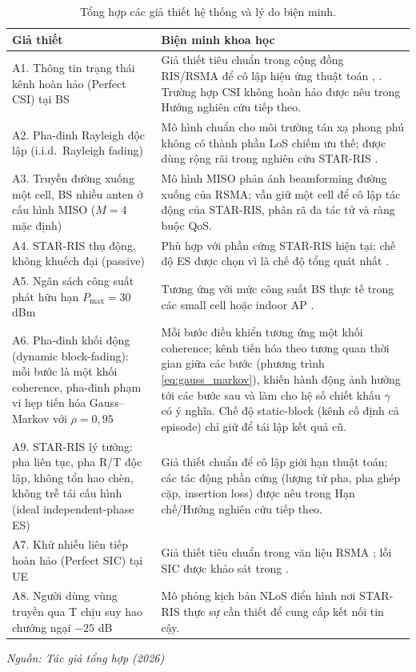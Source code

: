 \begin{table}[t]
\centering
\small
\caption{Tổng hợp các giả thiết hệ thống và lý do biện minh.}
\label{tab:assumptions}
\begin{tabular}{p{5.5cm} p{9cm}}
\toprule
\textbf{Giả thiết} & \textbf{Biện minh khoa học} \\
\midrule
A1. Thông tin trạng thái kênh hoàn hảo (Perfect CSI) tại BS &
Giả thiết tiêu chuẩn trong cộng đồng RIS/RSMA để cô lập hiệu ứng thuật toán \cite{liu2021starris}, \cite{mao2022rsma}. Trường hợp CSI không hoàn hảo được nêu trong Hướng nghiên cứu tiếp theo. \\
\addlinespace
A2. Pha-đinh Rayleigh độc lập (i.i.d.\ Rayleigh fading) &
Mô hình chuẩn cho môi trường tán xạ phong phú không có thành phần LoS chiếm ưu thế; được dùng rộng rãi trong nghiên cứu STAR-RIS \cite{mu2022simultaneously}. \\
\addlinespace
A3. Truyền đường xuống một cell, BS nhiều anten ở cấu hình MISO ($M=4$ mặc định) &
Mô hình MISO phản ánh beamforming đường xuống của RSMA; vẫn giữ một cell để cô lập tác động của STAR-RIS, phân rã đa tác tử và ràng buộc QoS. \\
\addlinespace
A4. STAR-RIS thụ động, không khuếch đại (passive) &
Phù hợp với phần cứng STAR-RIS hiện tại; chế độ ES được chọn vì là chế độ tổng quát nhất \cite{liu2021starris}. \\
\addlinespace
A5. Ngân sách công suất phát hữu hạn $P_{\max} = 30$ dBm &
Tương ứng với mức công suất BS thực tế trong các small cell hoặc indoor AP \cite{wu2020smart}. \\
\addlinespace
A6. Pha-đinh khối động (dynamic block-fading): mỗi bước là một khối coherence, pha-đinh phạm vi hẹp tiến hóa Gauss--Markov với $\rho=0{,}95$ &
Mỗi bước điều khiển tương ứng một khối coherence; kênh tiến hóa theo tương quan thời gian giữa các bước (phương trình \eqref{eq:gauss_markov}), khiến hành động ảnh hưởng tới các bước sau và làm cho hệ số chiết khấu $\gamma$ có ý nghĩa. Chế độ static-block (kênh cố định cả episode) chỉ giữ để tái lập kết quả cũ. \\
\addlinespace
A9. STAR-RIS lý tưởng: pha liên tục, pha R/T độc lập, không tổn hao chèn, không trễ tái cấu hình (ideal independent-phase ES) &
Giả thiết chuẩn để cô lập giới hạn thuật toán; các tác động phần cứng (lượng tử pha, pha ghép cặp, insertion loss) được nêu trong Hạn chế/Hướng nghiên cứu tiếp theo. \\
\addlinespace
A7. Khử nhiễu liên tiếp hoàn hảo (Perfect SIC) tại UE &
Giả thiết tiêu chuẩn trong văn liệu RSMA \cite{mao2022rsma}; lỗi SIC được khảo sát trong \cite{gomes2024performance}. \\
\addlinespace
A8. Người dùng vùng truyền qua T chịu suy hao chướng ngại $-25$ dB &
Mô phỏng kịch bản NLoS điển hình nơi STAR-RIS thực sự cần thiết để cung cấp kết nối tin cậy. \\
\bottomrule
\end{tabular}

\vspace{0.2em}
\hfill {\footnotesize\itshape Nguồn: Tác giả tổng hợp (2026)}
\end{table}
